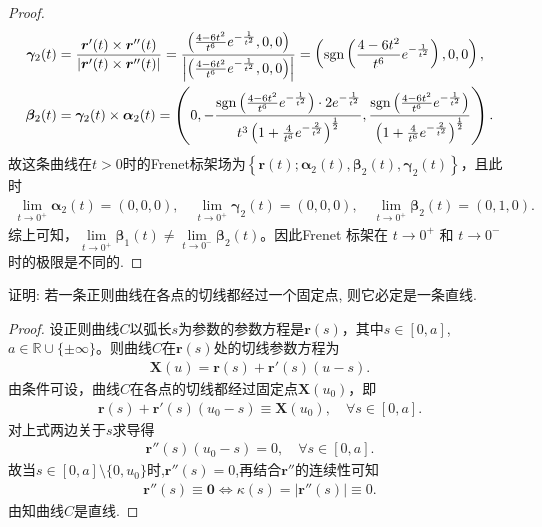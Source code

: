 \documentclass[../../main.tex]{subfiles}%
\begin{document}
\begin{proof}
\begin{align*}
\bm{\gamma}_2(t) &= \frac{\bm{r}'(t) \times \bm{r}''(t)}{|\bm{r}'(t) \times \bm{r}''(t)|} = \frac{\left( \frac{4-6t^2}{t^6}e^{-\frac{1}{t^2}},0,0 \right)}{\left| \left( \frac{4-6t^2}{t^6}e^{-\frac{1}{t^2}},0,0 \right) \right|} = \left( \operatorname{sgn}\left( \frac{4-6t^2}{t^6}e^{-\frac{1}{t^2}} \right) ,0,0 \right), \\
\bm{\beta}_2(t) &= \bm{\gamma}_2(t) \times \bm{\alpha}_2(t) = \left( 0,-\frac{\operatorname{sgn}\left( \frac{4-6t^2}{t^6}e^{-\frac{1}{t^2}} \right) \cdot 2e^{-\frac{1}{t^2}}}{t^3\left( 1+\frac{4}{t^6}e^{-\frac{2}{t^2}} \right)^{\frac{1}{2}}},\frac{\operatorname{sgn}\left( \frac{4-6t^2}{t^6}e^{-\frac{1}{t^2}} \right)}{\left( 1+\frac{4}{t^6}e^{-\frac{2}{t^2}} \right)^{\frac{1}{2}}} \right) .
\end{align*}
故这条曲线在$t>0$时的Frenet标架场为$\left\{ \bm{r}(t);\bm{\alpha}_2(t),\bm{\beta}_2(t),\bm{\gamma}_2(t) \right\}$，且此时
\begin{align*}
\lim\limits_{t\rightarrow 0^+}\bm{\alpha}_2(t) = \left( 0,0,0 \right), \quad \lim\limits_{t\rightarrow 0^+}\bm{\gamma}_2(t) = \left( 0,0,0 \right), \quad
\lim\limits_{t\rightarrow 0^+}\bm{\beta}_2(t) = \left( 0,1,0 \right) .
\end{align*}
综上可知，$\lim\limits_{t\rightarrow 0^+}\bm{\beta}_1(t) \ne \lim\limits_{t\rightarrow 0^-}\bm{\beta}_2(t)$。因此Frenet 标架在 $t \to 0^+$ 和 $t \to 0^-$ 时的极限是不同的.

\end{proof}

\begin{example}
证明: 若一条正则曲线在各点的切线都经过一个固定点, 则它必定是一条直线.
\end{example}
\begin{proof}

设正则曲线$C$以弧长$s$为参数的参数方程是$\bm{r}(s)$，其中$s\in[0,a]$,$a\in \mathbb{R}\cup\{\pm \infty\}$。则曲线$C$在$\bm{r}(s)$处的切线参数方程为
\begin{align*}
\bm{X}(u)=\bm{r}(s)+\bm{r}'(s)(u-s).
\end{align*}
由条件可设，曲线$C$在各点的切线都经过固定点$\bm{X}(u_0)$，即
\begin{align*}
\bm{r}(s)+\bm{r}'(s)(u_0-s)\equiv \bm{X}(u_0),\quad \forall s\in[0,a].
\end{align*}
对上式两边关于$s$求导得
\begin{align*}
\bm{r}''(s)(u_0-s)=0,\quad \forall s\in[0,a].
\end{align*}
故当$s\in [0,a]\setminus \{0,u_0\}$时,$\bm{r}''(s)=0$,再结合$\bm{r}''$的连续性可知
\begin{align*}
\bm{r}''(s)\equiv \bm{0}\Longleftrightarrow \kappa(s)=|\bm{r}''(s)|\equiv 0.
\end{align*}
由知曲线$C$是直线.

\end{proof}
\end{document}
